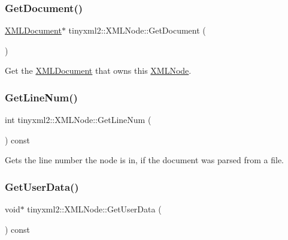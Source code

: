 \subsubsection{\texorpdfstring{Get\+Document()}{GetDocument()}\hspace{0.1cm}{\footnotesize\ttfamily [2/2]}}
{\footnotesize\ttfamily \mbox{\hyperlink{classtinyxml2_1_1_x_m_l_document}{X\+M\+L\+Document}}$\ast$ tinyxml2\+::\+X\+M\+L\+Node\+::\+Get\+Document (\begin{DoxyParamCaption}{ }\end{DoxyParamCaption})\hspace{0.3cm}{\ttfamily [inline]}}



Get the \mbox{\hyperlink{classtinyxml2_1_1_x_m_l_document}{X\+M\+L\+Document}} that owns this \mbox{\hyperlink{classtinyxml2_1_1_x_m_l_node}{X\+M\+L\+Node}}. 

\mbox{\label{classtinyxml2_1_1_x_m_l_node_a9b5fc636646fda761d342c72e91cb286}} 
\subsubsection{\texorpdfstring{Get\+Line\+Num()}{GetLineNum()}}
{\footnotesize\ttfamily int tinyxml2\+::\+X\+M\+L\+Node\+::\+Get\+Line\+Num (\begin{DoxyParamCaption}{ }\end{DoxyParamCaption}) const\hspace{0.3cm}{\ttfamily [inline]}}



Gets the line number the node is in, if the document was parsed from a file. 

\mbox{\label{classtinyxml2_1_1_x_m_l_node_a7f0687574afa03bc479dc44f29db0afe}} 
\subsubsection{\texorpdfstring{Get\+User\+Data()}{GetUserData()}}
{\footnotesize\ttfamily void$\ast$ tinyxml2\+::\+X\+M\+L\+Node\+::\+Get\+User\+Data (\begin{DoxyParamCaption}{ }\end{DoxyParamCaption}) const\hspace{0.3cm}{\ttfamily [inline]}}


